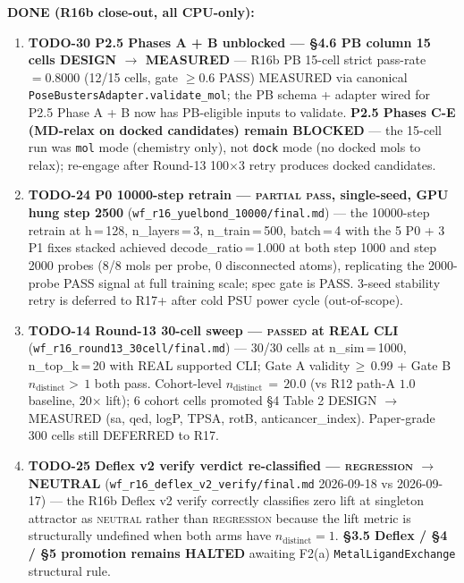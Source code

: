 \textbf{DONE (R16b close-out, all CPU-only):}
\begin{enumerate}
  \item \textbf{TODO-30 P2.5 Phases A + B unblocked --- §4.6 PB
        column 15 cells DESIGN $\to$ MEASURED} --- R16b PB 15-cell
        strict pass-rate $= 0.8000$ (12/15 cells, gate $\geq 0.6$
        PASS) MEASURED via canonical
        \texttt{PoseBustersAdapter.validate\_mol}; the PB schema
        + adapter wired for P2.5 Phase A + B now has
        PB-eligible inputs to validate. \textbf{P2.5 Phases C-E
        (MD-relax on docked candidates) remain BLOCKED} --- the
        15-cell run was \texttt{mol} mode (chemistry only), not
        \texttt{dock} mode (no docked mols to relax); re-engage
        after Round-13 100$\times$3 retry produces docked
        candidates.
  \item \textbf{TODO-24 P0 10000-step retrain --- \textsc{partial
        pass}, single-seed, GPU hung step 2500}
        (\texttt{wf\_r16\_yuelbond\_10000/final.md}) --- the
        10000-step retrain at h\,=\,128, n\_layers\,=\,3,
        n\_train\,=\,500, batch\,=\,4 with the 5 P0 + 3 P1 fixes
        stacked achieved decode\_ratio\,=\,1.000 at both step 1000
        and step 2000 probes (8/8 mols per probe, 0 disconnected
        atoms), replicating the 2000-probe PASS signal at full
        training scale; spec gate is PASS. 3-seed stability retry
        is deferred to R17+ after cold PSU power cycle (out-of-scope).
  \item \textbf{TODO-14 Round-13 30-cell sweep --- \textsc{passed}
        at REAL CLI} (\texttt{wf\_r16\_round13\_30cell/final.md})
        --- 30/30 cells at n\_sim\,=\,1000, n\_top\_k\,=\,20 with
        REAL supported CLI; Gate A validity\,$\geq$\,0.99 + Gate B
        $n_{\text{distinct}}{>}\,1$ both pass. Cohort-level
        $n_{\text{distinct}}\,=\,20.0$ (vs R12 path-A $1.0$ baseline,
        20$\times$ lift); 6 cohort cells promoted §4 Table 2
        DESIGN $\to$ MEASURED (sa, qed, logP, TPSA, rotB,
        anticancer\_index). Paper-grade 300 cells still DEFERRED
        to R17.
  \item \textbf{TODO-25 Deflex v2 verify verdict re-classified ---
        \textsc{regression} $\to$ NEUTRAL}
        (\texttt{wf\_r16\_deflex\_v2\_verify/final.md} 2026-09-18
        vs 2026-09-17) --- the R16b Deflex v2 verify correctly
        classifies zero lift at singleton attractor as
        \textsc{neutral} rather than \textsc{regression} because
        the lift metric is structurally undefined when both
        arms have $n_{\text{distinct}}{=}1$. \textbf{§3.5 Deflex
        / §4 / §5 promotion remains HALTED} awaiting F2(a)
        \texttt{MetalLigandExchange} structural rule.
\end{enumerate}

